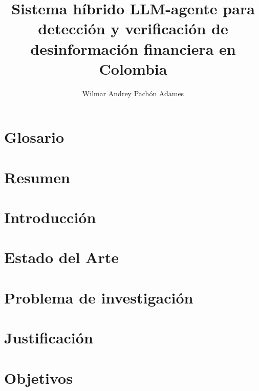 \documentclass[12pt]{MIA-USA}
\title{Sistema h\'ibrido LLM-agente para detecci\'on y verificaci\'on de desinformaci\'on financiera en Colombia}
\author{Wilmar Andrey Pach\'on Adames}
\begin{document}
	
	\maketitle
    
    \tableofcontents
    \listoffigures
    \listoftables
    
    
    
    \chapter*{Glosario}
 	
 	
	\chapter*{Resumen}
 	

    \chapter{Introducci\'on}
    
    
    \chapter{Estado del Arte}
    
    
    \chapter{Problema de investigaci\'on}
    
    
    \chapter{Justificaci\'on}
    
    
    \chapter{Objetivos}
    
    
\end{document}
